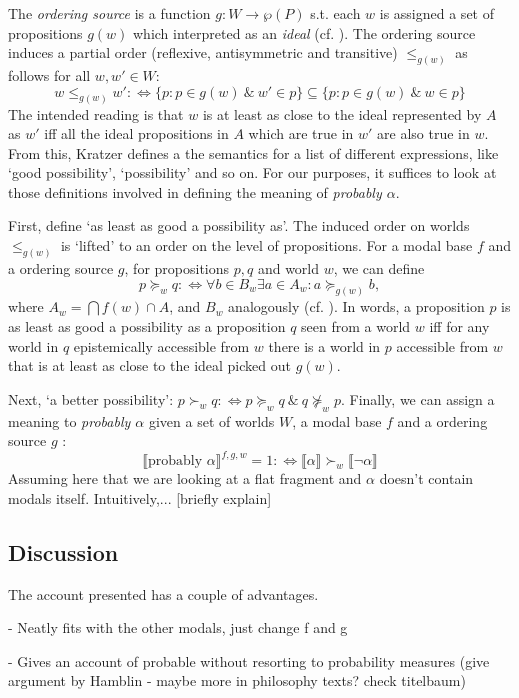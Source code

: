 \documentclass{article}
\newcommand{\lb}{\llbracket}
\newcommand{\rb}{\rrbracket}
\begin{document}
The \emph{ordering source} is a function $g: W \rightarrow \wp(P)$ s.t. each $w$ is assigned a set of propositions $g(w)$ which interpreted as an \emph{ideal} (cf. \cite{lewis81_order_seman_premis_seman_count}). The ordering source induces a partial order (reflexive, antisymmetric and transitive) $\leq_{g(w)}$ as follows for all $w,w' \in W$: 
\[
w \leq_{g(w)} w' :\iff \{p: p\in g(w) ~\&~ w' \in p\} \subseteq \{p: p\in  g(w) ~\&~ w \in p\}
\]
The intended reading is that $w$ is at least as close to the ideal represented by $A$ as $w'$ iff all the ideal propositions in $A$ which are true in $w'$ are also true in $w$.
From this, Kratzer defines a the semantics for a list of different expressions, like `good possibility', `possibility' and so on.
For our purposes, it suffices to look at those definitions involved in defining the meaning of \emph{probably $\alpha$}.

First, define `as least as good a possibility as'.
The induced order on worlds $\leq_{g(w)}$ is `lifted' to an order on the level of propositions.
For a modal base $f$ and a ordering source $g$, for propositions $p,q$ and world $w$, we can define
\[
    p \succeq_w q :\iff \forall b \in B_w \exists a \in A_w: a \succeq_{g(w)} b,
\]
where $A_w = \bigcap f(w) \cap A$, and $B_w$ analogously (cf. \cite[][p.~519]{holliday13_measur}).
In words, a proposition $p$ is as least as good a possibility as a proposition $q$ seen from a world $w$ iff for any world in $q$ epistemically accessible from $w$ there is a world in $p$ accessible from $w$ that is at least as close to the ideal picked out $g(w)$.

Next, `a better possibility': $p \succ_w q :\iff p \succeq_w q ~\&~ q \not\succeq_w p$.  
Finally, we can assign a meaning to \emph{probably $\alpha$} given a set of worlds $W$, a modal base $f$ and a ordering source $g$ \parencite[][p.~645]{kratzer91_modal}:
\[
\llbracket \text{probably } \alpha \rrbracket^{f,g,w} = 1 :\iff \lb \alpha \rb \succ_w \lb \neg\alpha \rb
\]
Assuming here that we are looking at a flat fragment and $\alpha$ doesn't contain modals itself.
Intuitively,... [briefly explain]
\subsection{Discussion}

The account presented has a couple of advantages.

- Neatly fits with the other modals, just change f and g

- Gives an account of probable without resorting to probability measures (give argument by Hamblin - maybe more in philosophy texts? check titelbaum)
\end{document}
